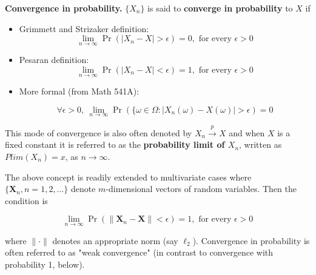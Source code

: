 \begin{definition} \textbf{Convergence in probability.} \(\{X_n\}\) is said to \textbf{converge in probability} to \(X\) if
\begin{itemize}

\item Grimmett and Strizaker definition:
\[
\lim_{n \to \infty} \Pr(|X_n -X| > \epsilon) = 0, \text{ for every } \epsilon > 0
\]

\item Pesaran definition:
\[
\lim_{n \to \infty} \Pr(|X_n -X| < \epsilon) = 1, \text{ for every } \epsilon > 0
\]

\item More formal (from Math 541A):

\[
\forall \epsilon > 0, \ \lim_{n \to \infty} \Pr(\{\omega \in \Omega : |X_n(\omega) - X(\omega)| > \epsilon) = 0
\]

\end{itemize}

\begin{remark}This mode of convergence is also often denoted by \(X_n \xrightarrow{p} X\) and when \(X\) is a fixed constant it is referred to as the \textbf{probability limit of \(X_n\)}, written as \(Plim(X_n) = x\), as \(n \to \infty\).

The above concept is readily extended to multivariate cases where \(\{ \boldsymbol{X}_n, n = 1, 2, \ldots \}\) denote \(m\)-dimensional vectors of random variables. Then the condition is

\[
\lim_{n \to \infty} \Pr(\lVert \boldsymbol{X}_n -\boldsymbol{X}\rVert  < \epsilon) = 1, \text{ for every } \epsilon > 0
\]

where \(\lVert \cdot \rVert \) denotes an appropriate norm (say \(\ell_2\)). Convergence in probability is often referred to as "weak convergence" (in contrast to convergence with probability 1, below).
\end{remark}
\end{definition} 

